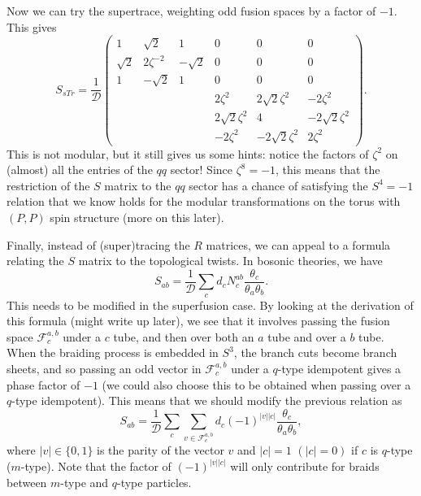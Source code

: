 \documentclass[12pt,a4paper]{article}
\newcommand{\mcd}{\mathcal{D}}
\newcommand\be            {\begin{equation}}
\newcommand\ee            {\end{equation}}
\newcommand{\fld}{\mathcal{F}}
\begin{document}
{{Now we can try the supertrace, weighting odd fusion spaces by a factor of $-1$. This gives 
\be S_{sTr} = \frac{1}{\mcd} \begin{pmatrix} 
1&\sqrt{2}&1&0&0&0 \\
 \sqrt{2}&2\zeta^{-2}&-\sqrt{2}&0&0&0 \\ 
 1&-\sqrt{2}&1&0&0&0 \\ 
 &&&2\zeta^2&2\sqrt{2}\zeta^2&-2\zeta^2 \\ 
 &&&2\sqrt{2}\zeta^2&4&-2\sqrt{2}\zeta^2\\ 
 &&&-2\zeta^2 & -2\sqrt{2}\zeta^2 & 2\zeta^2 \end{pmatrix}. \ee
This is not modular, but it still gives us some hints:
notice the factors of $\zeta^2$ on (almost) all the entries of the $qq$ sector! Since $\zeta^8 = -1$, this means that the restriction of the $S$ matrix to the $qq$ sector has a chance of satisfying the $S^4=-1$ relation that we know holds for the modular transformations on the torus with $(P,P)$ spin structure (more on this later). 

Finally, instead of (super)tracing the $R$ matrices, we can appeal to a formula relating the $S$ matrix to the topological twists. In bosonic theories, we have 
\be S_{ab} = \frac{1}{\mcd} \sum_c d_c N^{ab}_c \frac{\theta_c}{\theta_a\theta_b}.\ee
This needs to be modified in the superfusion case. By looking at the derivation of this formula (might write up later), we see that it involves passing the fusion space $\fld^{a,b}_c$ under a $c$ tube, and then over both an $a$ tube and over a $b$ tube. When the braiding process is embedded in $S^3$, the branch cuts become branch sheets, and so passing an odd vector in $\fld^{a,b}_c$ under a $q$-type idempotent gives a phase factor of $-1$ (we could also choose this to be obtained when passing over a $q$-type idempotent). This means that we should modify the previous relation as 
\be S_{ab} = \frac{1}{\mcd} \sum_c \sum_{v \in \fld^{a,b}_c} d_c (-1)^{|v| |c|}   \frac{\theta_c}{\theta_a\theta_b},\ee
where $|v| \in \{0,1\}$ is the parity of the vector $v$ and $|c| = 1$ $(|c|=0)$ if $c$ is $q$-type ($m$-type). Note that the factor of $(-1)^{|v||c|}$ will only contribute for braids between $m$-type and $q$-type particles. 

}}
\end{document}

